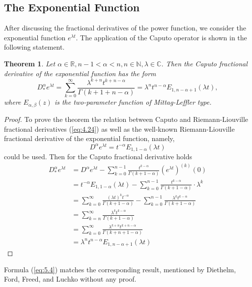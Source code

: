 \documentclass[a4paper,14pt,oneside]{book}
\theoremstyle{plain}
\newtheorem{thm}{Theorem}[section]
\theoremstyle{definition}
\theoremstyle{remark}
\begin{document}
\begin{center}
\begin{flushleft}
\section{The Exponential Function}
After discussing the fractional derivatives of the power function, we consider the exponential function $e^{\lambda t}$. The application of the Caputo operator is shown in the following statement.
\begin{thm}
Let $\alpha \in \mathbb{R}, n-1<\alpha<n, n \in \mathbb{N}, \lambda \in \mathbb{C}$. Then the Caputo fractional derivative of the exponential function has the form
\begin{equation}\label{eq:5.4}
D_{*}^{\alpha} e^{\lambda t}=\sum_{k=0}^{\infty} \frac{\lambda^{k+n} t^{k+n-\alpha}}{\Gamma(k+1+n-\alpha)}=\lambda^{n} t^{n-\alpha} E_{1, n-\alpha+1}(\lambda t),
\end{equation}
where $E_{\alpha, \beta}(z)$ is the two-parameter function of Mittag-Leffler type.
\end{thm}
\begin{proof}
To prove the theorem the relation between Caputo and Riemann-Liouville fractional derivatives (\ref{eq:4.24}) as well as the well-known Riemann-Liouville fractional derivative of the exponential function, namely,
$$
D^{\alpha} e^{\lambda t}=t^{-\alpha} E_{1,1-\alpha}(\lambda t)
$$
could be used. Then for the Caputo fractional derivative holds
$$
\begin{aligned}
D_{*}^{\alpha} e^{\lambda t} &=D^{\alpha} e^{\lambda t}-\sum_{k=0}^{n-1} \frac{t^{k-\alpha}}{\Gamma(k+1-\alpha)}\left(e^{\lambda t}\right)^{(k)}(0) \\
&=t^{-\alpha} E_{1,1-\alpha}(\lambda t)-\sum_{k=0}^{n-1} \frac{t^{k-\alpha}}{\Gamma(k+1-\alpha)} \cdot \lambda^{k} \\
&=\sum_{k=0}^{\infty} \frac{(\lambda t)^{k} t^{-\alpha}}{\Gamma(k+1-\alpha)}-\sum_{k=0}^{n-1} \frac{\lambda^{k} t^{k-\alpha}}{\Gamma(k+1-\alpha)} \\
&=\sum_{k=n}^{\infty} \frac{\lambda^{k} t^{k-\alpha}}{\Gamma(k+1-\alpha)} \\
&=\sum_{k=0}^{\infty} \frac{\lambda^{k+n} t^{k+n-\alpha}}{\Gamma(k+n+1-\alpha)} \\
&=\lambda^{n} t^{n-\alpha} E_{1, n-\alpha+1}(\lambda t)
\end{aligned}
$$
\end{proof}
Formula (\ref{eq:5.4}) matches the corresponding result, mentioned by Diethelm, Ford, Freed, and Luchko \cite{bb15} without any proof.\\

\end{flushleft}
\end{center}
\end{document}
